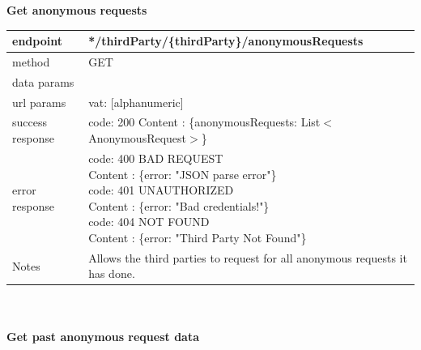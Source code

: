 \begin{legal}
\begin{legal}
\begin{itemize}
								\textbf{Get anonymous requests} \\
			
								\begin{tabularx}{\linewidth}{| l| l }
									\hline
									endpoint & */thirdParty/\{thirdParty\}/anonymousRequests \\
									\hline
									method & GET \\
									\hline
									data params & \\
									\hline
									url params &
									\parbox{0.7\textwidth}{
										\bigskip
										vat: [alphanumeric]
										\bigskip
									} \\
									\hline
									success response &
									\parbox{0.7\textwidth}{
										\bigskip
										code: 200\\
										Content : \{anonymousRequests: List$<$AnonymousRequest$>$\}
										\bigskip
									} \\
									\hline
									error response &
									\parbox{0.7\textwidth}{
										\bigskip
										code: 400 BAD REQUEST \\
										Content : \{error: "JSON parse error"\}\\
										code: 401 UNAUTHORIZED \\
										Content : \{error: "Bad credentials!"\}\\
										code: 404 NOT FOUND \\
										Content : \{error: "Third Party Not Found"\}
										\bigskip
									} \\
									\hline
									Notes & 
									\parbox{0.7\textwidth}{
										\bigskip Allows the third parties to request for all anonymous requests it has done.
									\bigskip}  \\
									\hline
								\end{tabularx}\\\\
								
								\textbf{Get past anonymous request data} \\
			

\end{itemize}
\end{legal}
\end{legal}
